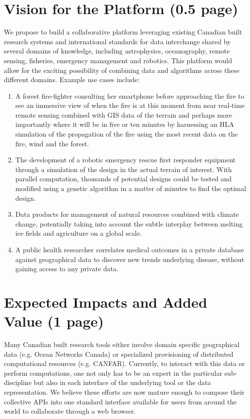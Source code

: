 \documentclass[pdftex,12pt]{article}
\begin{document}
\pagestyle{myheadings}

\section{Vision for the Platform (0.5 page)}

We propose to build a collaborative platform leveraging existing
Canadian built research systems and international standards for data
interchange shared by several domains of knowledge, including
astrophysics, oceanography, remote sensing, fisheries, emergency
management and robotics.  This platform would allow for the exciting
possibility of combining data and algorithms across these different
domains.  Example use cases include:
\begin{enumerate}
\item A forest fire-fighter consulting her smartphone before
  approaching the fire to see an immersive view of when the fire is at
  this moment from near real-time remote sensing combined with GIS
  data of the terrain and perhaps more importantly where it will be in
  five or ten minutes by harnessing an HLA simulation of the
  propagation of the fire using the most recent data on the fire, wind
  and the forest.
\item The development of a robotic emergency rescue first responder
  equipment through a simulation of the design in the actual terrain
  of interest.  With parallel computation, thousands of potential
  designs could be tested and modified using a genetic algorithm in a
  matter of minutes to find the optimal design.
\item Data products for management of natural resources combined with
  climate change, potentially taking into account the subtle interplay
  between melting ice fields and agriculture on a global scale.
\item A public health researcher correlates medical outcomes in a
  private database against geographical data to discover new trends
  underlying disease, without gaining access to any private data.
\end{enumerate}

\section{Expected Impacts and Added Value  (1 page)}

Many Canadian built research tools either involve domain specific
geographical data (e.g. Ocean Networks Canada) or specialized
provisioning of distributed computational resources
(e.g. CANFAR). Currently, to interact with this data or perform
computations, one not only has to be an expert in the particular
sub-discipline but also in each interface of the underlying tool or
the data representation.  We believe these efforts are now mature
enough to compose their collective APIs into one standard interface
available for users from around the world to collaborate through a web
browser.
\end{document}

